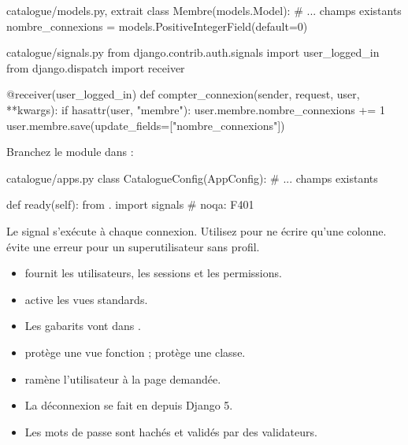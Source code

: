 \begin{correction}
\begin{codebox}[python]{catalogue/models.py, extrait}
class Membre(models.Model):
    # ... champs existants
    nombre_connexions = models.PositiveIntegerField(default=0)
\end{codebox}

\begin{codebox}[python]{catalogue/signals.py}
from django.contrib.auth.signals import user_logged_in
from django.dispatch import receiver


@receiver(user_logged_in)
def compter_connexion(sender, request, user, **kwargs):
    if hasattr(user, "membre"):
        user.membre.nombre_connexions += 1
        user.membre.save(update_fields=["nombre_connexions"])
\end{codebox}

Branchez le module dans  :

\begin{codebox}[python]{catalogue/apps.py}
class CatalogueConfig(AppConfig):
    # ... champs existants

    def ready(self):
        from . import signals  # noqa: F401
\end{codebox}

\begin{note}
Le signal s'exécute à chaque connexion. Utilisez  pour ne
écrire qu'une colonne.  évite une erreur pour un superutilisateur
sans profil.
\end{note}
\end{correction}

\begin{retenir}
\begin{itemize}
  \item {} fournit les utilisateurs, les sessions et les
        permissions.
  \item {} active les vues standards.
  \item Les gabarits vont dans .
  \item {} protège une vue fonction ;
         protège une classe.
  \item {} ramène l'utilisateur à la page demandée.
  \item La déconnexion se fait en  depuis Django 5.
  \item Les mots de passe sont hachés et validés par des validateurs.
\end{itemize}
\end{retenir}
